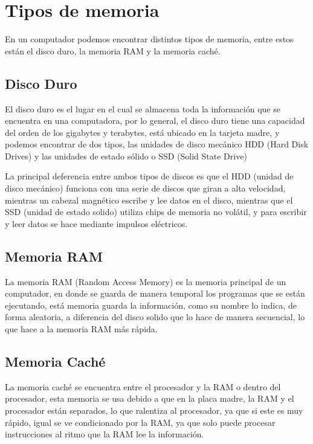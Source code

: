 \documentclass{article}
\begin{document}
\section{Tipos de memoria} \label{contenido}
En un computador podemos encontrar distintos tipos de memoria, entre estos están el disco duro, la memoria RAM y la memoria caché.

\subsection{Disco Duro}
El disco duro es el lugar en el cual se almacena toda la información que se encuentra en una computadora, por lo general, el disco duro tiene una capacidad del orden de los gigabytes y terabytes, está ubicado en la tarjeta madre, y podemos encontrar de dos tipos, las unidades de disco mecánico HDD (Hard Disk Drives) y las unidades de estado sólido o SSD (Solid State Drive)
\vspace{0.5cm}

La principal deferencia entre ambos tipos de discos es que el HDD (unidad de disco mecánico) funciona con una serie de discos que giran a alta velocidad, mientras un cabezal magnético escribe y lee datos en el disco, mientras que el SSD (unidad de estado solido) utiliza chips de memoria no volátil, y para escribir y leer datos se hace mediante impulsos eléctricos.\cite{andres2017cual} 

\subsection{Memoria RAM}
La memoria RAM (Random Access Memory) es la memoria principal de un computador, en donde se guarda de manera temporal los programas que se están ejecutando, está memoria  guarda la información, como su nombre lo indica, de forma aleatoria, a diferencia del disco solido que lo hace de manera secuencial, lo que hace a la memoria RAM más rápida.\cite{rebollo2011memoria}

\subsection{Memoria Caché}
La memoria caché se encuentra entre el procesador y la RAM o dentro del procesador, esta memoria se usa debido a que en la placa madre, la RAM y el procesador están separados, lo que ralentiza al procesador, ya que si este es muy rápido, igual se ve condicionado por la RAM, ya que solo puede procesar instrucciones al ritmo que la RAM lee la información.
\vspace{0.5cm}
\end{document}

